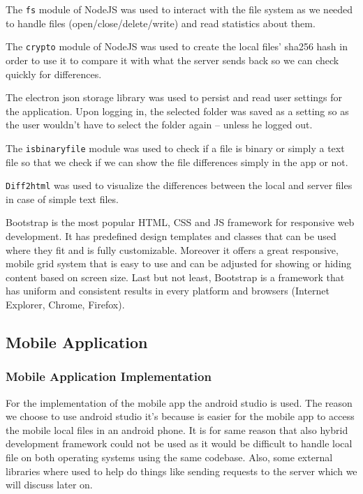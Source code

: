 \documentclass[11pt]{article}
\begin{document}
The {\tt fs} module \cite{fs:19} of NodeJS was used to interact with the file system as we needed to handle files (open/close/delete/write) and read statistics about them.

The {\tt crypto} module \cite{crypto:19} of NodeJS was used to create the local files’ sha256 hash in order to use it to compare it with what the server sends back so we can check quickly for differences.

The electron json storage library \cite{electron-json-storage:19} was used to persist and read user settings for the application. Upon logging in, the selected folder was saved as a setting so as the user wouldn’t have to select the folder again – unless he logged out.

The {\tt isbinaryfile} module \cite{isbinaryfile:19} was used to check if a file is binary or simply a text file so that we check if we can show the file differences simply in the app or not.

{\tt Diff2html} \cite{diff2html:19} was used to visualize the differences between the local and server files in case of simple text files.

Bootstrap \cite{bootstrap:19} is the most popular HTML, CSS and JS framework for responsive web development. It has predefined design templates and classes that can be used where they fit and is fully customizable. Moreover it offers a great responsive, mobile grid system that is easy to use and can be adjusted for showing or hiding content based on screen size. Last but not least, Bootstrap is a framework that has uniform and consistent results in every platform and browsers (Internet Explorer, Chrome, Firefox).

\subsection{Mobile Application}

\subsubsection*{Mobile Application Implementation}

For the implementation of the mobile app the android studio \cite{androidstudio:19} is used. The reason we choose to use android studio it’s because is easier for the mobile app to access the mobile local files in an android phone. It is for same reason that also hybrid development framework could not be used as it would be difficult to handle local file on both operating systems using the same codebase. Also, some external libraries where used to help do things like sending requests to the server which we will discuss later on.
\end{document}
